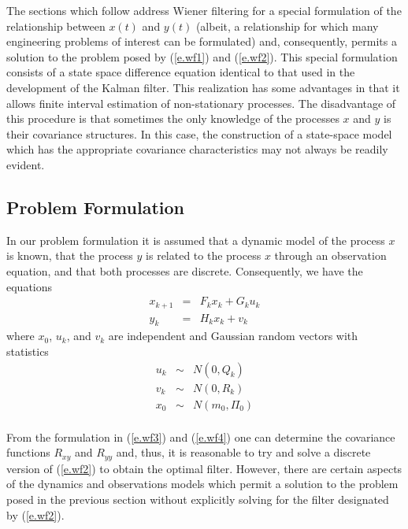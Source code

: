	The sections which follow address Wiener filtering
for a special formulation of the relationship
between $x(t)$ and $y(t)$ (albeit, a relationship for which
many engineering problems of interest can be formulated) and,
consequently, permits a solution to the problem posed by 
(\ref{e.wf1}) and (\ref{e.wf2}).  This special formulation
consists of a state space difference equation identical to that
used in the development of the Kalman filter.  This realization
has some advantages in that it allows finite interval estimation
of non-stationary processes.  The disadvantage of this procedure
is that sometimes the only knowledge of the processes $x$ and $y$
is their covariance structures.  In this case, the construction of a 
state-space model which has the appropriate covariance 
characteristics may not always be readily evident.

\subsection{Problem Formulation}

	In our problem formulation it is assumed
that a dynamic model of the process $x$ is known,
that the process $y$ is related to the process $x$
through an observation equation, and that both
processes are discrete.  Consequently, we have 
the equations
%
\begin{eqnarray}
x_{k+1}&=&F_kx_k+G_ku_k\nonumber\\
y_k&=&H_kx_k+v_k
\label{e.wf3}
\end{eqnarray}
%
where $x_0$, $u_k$, and $v_k$ are independent and Gaussian
random vectors with statistics
%
\begin{eqnarray}
u_k&\sim&N(0,Q_k)\nonumber\\
v_k&\sim&N(0,R_k)\nonumber\\
x_0&\sim&N(m_0,\Pi_0)\nonumber\\
\label{e.wf4}
\end{eqnarray}
%

	From the formulation in (\ref{e.wf3}) and (\ref{e.wf4})
one can determine the covariance functions $R_{xy}$ and $R_{yy}$
and, thus, it is reasonable to try and solve a discrete version of
(\ref{e.wf2}) to obtain the optimal filter.
However, there are certain aspects of the 
dynamics and observations models which permit
a solution to the problem posed in the previous
section without explicitly solving for
the filter designated by (\ref{e.wf2}).

